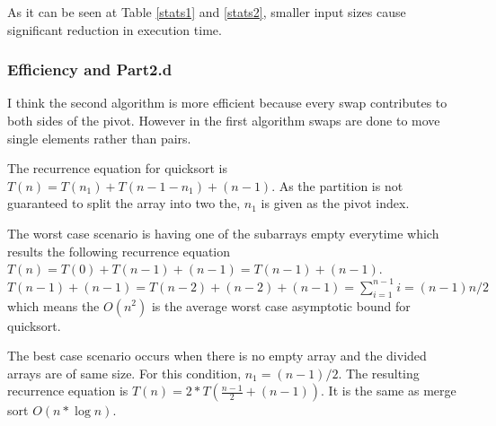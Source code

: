 
As it can be seen at Table \ref{stats1} and \ref{stats2}, smaller input sizes cause significant reduction in execution time.

\par
\subsubsection{Efficiency and Part2.d}

I think the second algorithm is more efficient because every swap contributes to both sides of the pivot. However in the first algorithm swaps are done to move single elements rather than pairs. 

The recurrence equation for quicksort is \( T(n) = T(n_1) + T(n - 1 - n_1) + (n - 1)\). As the partition is not guaranteed to split the array into two the, \( n_1\) is given as the pivot index. 

\par

The worst case scenario is having one of the subarrays empty everytime which results the following recurrence equation\( T(n) = T(0) + T(n - 1 ) + (n - 1) = T(n - 1) + (n - 1)\). \(T(n - 1) + (n - 1) = T(n - 2) + (n - 2) + (n - 1) = \sum_{i=1}^{n-1} i  = (n - 1)n/2 \) which means the \(O(n^2)  \) is the average worst case asymptotic bound for quicksort.

The best case scenario occurs when there is no empty array and the divided arrays are of same size. For this condition, \( n_1 = (n - 1)/2 \). The resulting recurrence equation is \(T(n) = 2*T(\frac{n-1}{2} + (n - 1)) \). It is the same as merge sort \(O(n*\log n ) \).  

